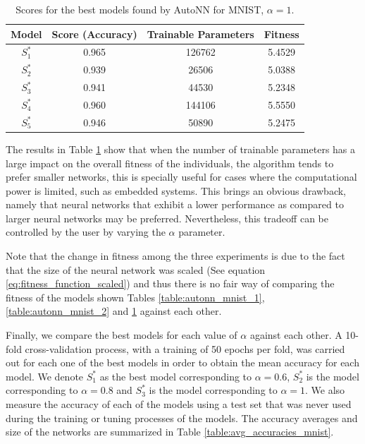 \documentclass[journal]{IEEEtran}
\begin{document}
\begin{table}[!htb]
\begin{center}
\begin{tabular}{| c | c | c | c |}
\hline
Model & Score (Accuracy) & Trainable Parameters & Fitness\\
\hline
$S^*_1$ & 0.965 & 126762 & 5.4529\\
$S^*_2$ & 0.939 & 26506 & 5.0388\\
$S^*_3$ & 0.941 & 44530 & 5.2348\\
$S^*_4$ & 0.960 & 144106 & 5.5550\\
$S^*_5$ & 0.946 & 50890 & 5.2475\\
\hline
\end{tabular}
\end{center}
\caption{Scores for the best models found by AutoNN for MNIST, $\alpha = 1$.}
\label{table:autonn_mnist_3}
\end{table}


The results in Table \ref{table:autonn_mnist_3} show that when the number of trainable parameters has a large impact on the overall fitness of the individuals, the algorithm tends to prefer smaller networks, this is specially useful for cases where the computational power is limited, such as embedded systems. This brings an obvious drawback, namely that neural networks that exhibit a lower performance as compared to larger neural networks may be preferred. Nevertheless, this tradeoff can be controlled by the user by varying the $\alpha$ parameter. 

Note that the change in fitness among the three experiments is due to the fact that the size of the neural network was scaled (See equation \ref{eq:fitness_function_scaled}) and thus there is no fair way of comparing the fitness of the models shown Tables \ref{table:autonn_mnist_1}, \ref{table:autonn_mnist_2} and \ref{table:autonn_mnist_3} against each other.

Finally, we compare the best models for each value of $\alpha$ against each other. A 10-fold cross-validation process, with a training of 50 epochs per fold, was carried out for each one of the best models in order to obtain the mean accuracy for each model. We denote $ S^*_1$ as the best model corresponding to $\alpha = 0.6$, $S^*_2$ is the model corresponding to $\alpha = 0.8$ and $S^*_3$ is the model corresponding to $\alpha = 1$. We also measure the accuracy of each of the models using a test set that was never used during the training or tuning processes of the models. The accuracy averages and size of the networks are summarized in Table \ref{table:avg_accuracies_mnist}.
\end{document}
